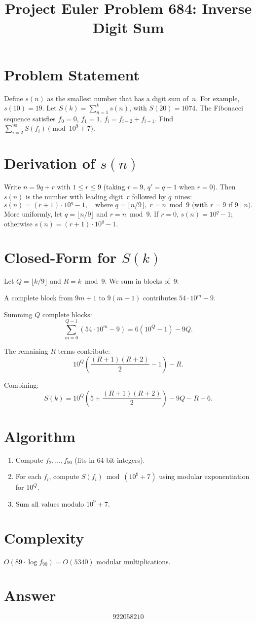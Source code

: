 \documentclass[12pt]{article}
\title{Project Euler Problem 684: Inverse Digit Sum}
\author{}
\date{}
\begin{document}
\maketitle

\section{Problem Statement}
Define $s(n)$ as the smallest number that has a digit sum of~$n$. For example, $s(10)=19$.
Let $S(k)=\sum_{n=1}^{k}s(n)$, with $S(20)=1074$.
The Fibonacci sequence satisfies $f_0=0$, $f_1=1$, $f_i=f_{i-2}+f_{i-1}$.
Find $\displaystyle\sum_{i=2}^{90}S(f_i) \pmod{10^9+7}$.

\section{Derivation of $s(n)$}
Write $n=9q+r$ with $1\le r\le 9$ (taking $r=9,\,q' = q-1$ when $r=0$).
Then $s(n)$ is the number with leading digit~$r$ followed by $q$~nines:
\[
  s(n) = (r+1)\cdot 10^q - 1, \quad \text{where } q=\lfloor n/9\rfloor,\; r = n\bmod 9 \text{ (with $r=9$ if $9\mid n$)}.
\]
More uniformly, let $q=\lfloor n/9\rfloor$ and $r = n\bmod 9$. If $r=0$, $s(n)=10^q-1$; otherwise $s(n)=(r+1)\cdot 10^q - 1$.

\section{Closed-Form for $S(k)$}
Let $Q=\lfloor k/9\rfloor$ and $R=k\bmod 9$. We sum in blocks of~9:

A complete block from $9m+1$ to $9(m+1)$ contributes $54\cdot 10^m - 9$.

Summing $Q$ complete blocks:
\[
  \sum_{m=0}^{Q-1}(54\cdot 10^m - 9) = 6(10^Q - 1) - 9Q.
\]

The remaining $R$ terms contribute:
\[
  10^Q\!\left(\frac{(R+1)(R+2)}{2}-1\right) - R.
\]

Combining:
\[
  \boxed{S(k) = 10^Q\!\left(5 + \frac{(R+1)(R+2)}{2}\right) - 9Q - R - 6.}
\]

\section{Algorithm}
\begin{enumerate}
  \item Compute $f_2,\ldots,f_{90}$ (fits in 64-bit integers).
  \item For each $f_i$, compute $S(f_i)\bmod(10^9+7)$ using modular exponentiation for $10^Q$.
  \item Sum all values modulo $10^9+7$.
\end{enumerate}

\section{Complexity}
$O(89\cdot\log f_{90})=O(5340)$ modular multiplications.

\section{Answer}

\[
\boxed{922058210}
\]
\end{document}
